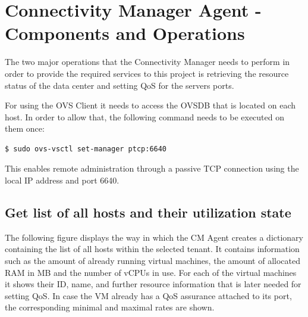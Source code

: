\section{Connectivity Manager Agent - Components and Operations}

The two major operations that the Connectivity Manager needs to perform in order to provide the required services to this project is retrieving the resource status of the data center and setting QoS for the servers ports.

For using the OVS Client it needs to access the OVSDB that is located on each host. In order to allow that, the following command needs to be executed on them once:
\begin{lstlisting}[language=commands]
$ sudo ovs-vsctl set-manager ptcp:6640
\end{lstlisting}

This enables remote administration through a passive TCP connection using the local IP address and port 6640. 

\subsection{Get list of all hosts and their utilization state}

The following figure displays the way in which the CM Agent creates a dictionary containing the list of all hosts within the selected tenant. It contains information such as the amount of already running virtual machines, the amount of allocated RAM in MB and the number of vCPUs in use. For each of the virtual machines it shows their ID, name, and further resource information that is later needed for setting QoS. In case the VM already has a QoS assurance attached to its port, the corresponding minimal and maximal rates are shown.

